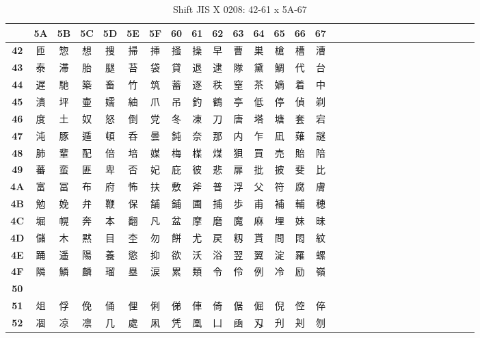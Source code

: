 \begin{table}[H]
\Fontified
\centering
\caption{Shift JIS X 0208: 42-61 x 5A-67}
\begin{tabular}{|Sc|Sc|Sc|Sc|Sc|Sc|Sc|Sc|Sc|Sc|Sc|Sc|Sc|Sc|Sc|}
\hline
 & \textbf{5A} & \textbf{5B} & \textbf{5C} & \textbf{5D} & \textbf{5E} & \textbf{5F} & \textbf{60} & \textbf{61} & \textbf{62} & \textbf{63} & \textbf{64} & \textbf{65} & \textbf{66} & \textbf{67} \\ \hline
\textbf{42} & 匝 & 惣 & 想 & 捜 & 掃 & 挿 & 掻 & 操 & 早 & 曹 & 巣 & 槍 & 槽 & 漕 \\ \hline
\textbf{43} & 泰 & 滞 & 胎 & 腿 & 苔 & 袋 & 貸 & 退 & 逮 & 隊 & 黛 & 鯛 & 代 & 台 \\ \hline
\textbf{44} & 遅 & 馳 & 築 & 畜 & 竹 & 筑 & 蓄 & 逐 & 秩 & 窒 & 茶 & 嫡 & 着 & 中 \\ \hline
\textbf{45} & 潰 & 坪 & 壷 & 嬬 & 紬 & 爪 & 吊 & 釣 & 鶴 & 亭 & 低 & 停 & 偵 & 剃 \\ \hline
\textbf{46} & 度 & 土 & 奴 & 怒 & 倒 & 党 & 冬 & 凍 & 刀 & 唐 & 塔 & 塘 & 套 & 宕 \\ \hline
\textbf{47} & 沌 & 豚 & 遁 & 頓 & 呑 & 曇 & 鈍 & 奈 & 那 & 内 & 乍 & 凪 & 薙 & 謎 \\ \hline
\textbf{48} & 肺 & 輩 & 配 & 倍 & 培 & 媒 & 梅 & 楳 & 煤 & 狽 & 買 & 売 & 賠 & 陪 \\ \hline
\textbf{49} & 蕃 & 蛮 & 匪 & 卑 & 否 & 妃 & 庇 & 彼 & 悲 & 扉 & 批 & 披 & 斐 & 比 \\ \hline
\textbf{4A} & 富 & 冨 & 布 & 府 & 怖 & 扶 & 敷 & 斧 & 普 & 浮 & 父 & 符 & 腐 & 膚 \\ \hline
\textbf{4B} & 勉 & 娩 & 弁 & 鞭 & 保 & 舗 & 鋪 & 圃 & 捕 & 歩 & 甫 & 補 & 輔 & 穂 \\ \hline
\textbf{4C} & 堀 & 幌 & 奔 & 本 & 翻 & 凡 & 盆 & 摩 & 磨 & 魔 & 麻 & 埋 & 妹 & 昧 \\ \hline
\textbf{4D} & 儲 & 木 & 黙 & 目 & 杢 & 勿 & 餅 & 尤 & 戻 & 籾 & 貰 & 問 & 悶 & 紋 \\ \hline
\textbf{4E} & 踊 & 遥 & 陽 & 養 & 慾 & 抑 & 欲 & 沃 & 浴 & 翌 & 翼 & 淀 & 羅 & 螺 \\ \hline
\textbf{4F} & 隣 & 鱗 & 麟 & 瑠 & 塁 & 涙 & 累 & 類 & 令 & 伶 & 例 & 冷 & 励 & 嶺 \\ \hline
\textbf{50} &  &  &  &  &  &  &  &  &  &  &  &  &  &  \\ \hline
\textbf{51} & 俎 & 俘 & 俛 & 俑 & 俚 & 俐 & 俤 & 俥 & 倚 & 倨 & 倔 & 倪 & 倥 & 倅 \\ \hline
\textbf{52} & 凅 & 凉 & 凛 & 几 & 處 & 凩 & 凭 & 凰 & 凵 & 凾 & 刄 & 刋 & 刔 & 刎 \\ \hline

\end{tabular}
\end{table}
